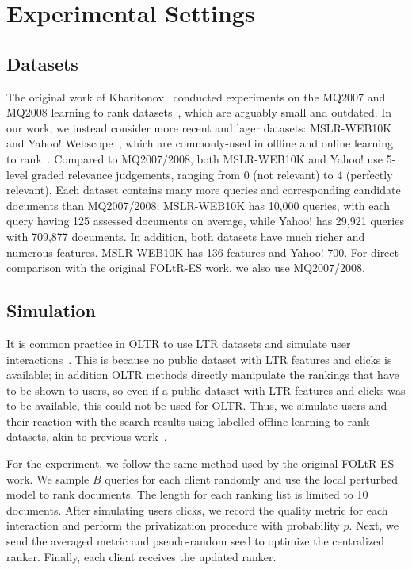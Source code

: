 \section{Experimental Settings}

\subsection{Datasets}
The original work of Kharitonov~\cite{kharitonov2019federated} conducted experiments on the MQ2007 and MQ2008 learning to rank datasets~\cite{DBLP:journals/corr/QinL13}, which are arguably small and outdated. In our work, we instead consider more recent and lager datasets: MSLR-WEB10K~\cite{DBLP:journals/corr/QinL13} and Yahoo! Webscope~\cite{DBLP:journals/jmlr/ChapelleC11}, which are commonly-used in offline and online learning to rank~\cite{zhuang2020counterfactual,hofmann2013reusing,jagerman2019model,oosterhuis2018differentiable}. Compared to MQ2007/2008, both MSLR-WEB10K and Yahoo! use 5-level graded relevance judgements, ranging from 0 (not relevant) to 4 (perfectly relevant).
Each dataset contains many more queries and corresponding candidate documents than MQ2007/2008: MSLR-WEB10K has 10,000 queries, with each query having 125 assessed documents on average, while Yahoo! has 29,921 queries with 709,877 documents. In addition, both datasets have much richer and numerous features. MSLR-WEB10K has 136 features and Yahoo! 700. For direct comparison with the original FOLtR-ES work, we also use MQ2007/2008.

\subsection{Simulation}
It is common practice in OLTR to use LTR datasets and simulate user interactions~\cite{DBLP:conf/wsdm/SchuthOWR16, hofmann2013reusing}. This is because no public dataset with LTR features and clicks is available; in addition OLTR methods directly manipulate the rankings that have to be shown to users, so even if a public dataset with LTR features and clicks was to be available, this could not be used for OLTR. Thus, we simulate users and their reaction with the search results using labelled offline learning to rank datasets, akin to previous work~\cite{DBLP:conf/wsdm/SchuthOWR16, hofmann2013reusing}.

For the experiment, we follow the same method used by the original FOLtR-ES work. We sample $B$ queries for each client randomly and use the local perturbed model to rank documents. The length for each ranking list is limited to 10 documents. After simulating users clicks, we record the quality metric for each interaction and perform the privatization procedure with probability $p$. Next, we send the averaged metric and pseudo-random seed to optimize the centralized ranker. Finally, each client receives the updated ranker. 

